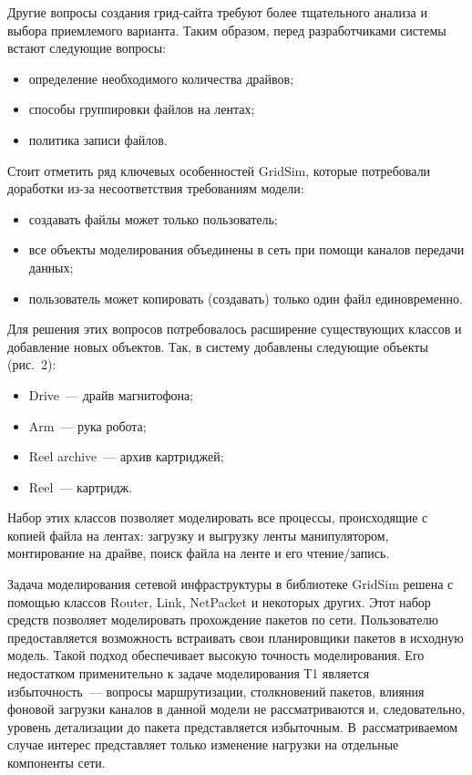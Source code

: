 \begin{multicols}{2}
   Другие вопросы создания грид-сай\-та требуют более тщательного анализа и 
выбора приемлемого варианта. Таким образом, перед разработчиками системы 
встают следующие вопросы:
   \begin{itemize}
   \item определение необходимого количества драйвов;
\item способы группировки файлов на лентах;
\item политика записи файлов.
\end{itemize}

   Стоит отметить ряд ключевых особенностей GridSim, которые потребовали 
доработки из-за несоответствия требованиям модели: 
   \begin{itemize}
   \item создавать файлы может только пользователь;
\item все объекты моделирования объединены в сеть при помощи 
каналов передачи данных;
\item пользователь может копировать (создавать) только один файл 
единовременно. 
\end{itemize}
   
   Для решения этих вопросов потребовалось расширение существующих 
классов и добавление новых объектов. Так, в сис\-те\-му добавлены следующие 
объекты (рис.~2):
   \begin{itemize}
\item Drive~--- драйв магнитофона;
\item Arm~--- рука робота;
\item Reel archive~--- архив картриджей;
\item Reel~--- картридж.
\end{itemize}




   Набор этих классов позволяет моделировать все процессы, происходящие с 
копией файла на лентах: загрузку и выгрузку ленты манипулятором, 
монтирование на драйве, поиск файла на ленте и его чте\-ние/за\-пись.
   
   Задача моделирования сетевой инфраструктуры в библиотеке GridSim 
решена с помощью классов Router, Link, NetPacket и некоторых других. Этот 
набор средств позволяет моделировать прохождение пакетов по сети. 
Пользователю предоставляется возможность встраивать свои планировщики 
пакетов в исходную модель. Такой подход обеспечивает высокую точность 
моделирования. Его недостатком применительно к задаче моделирования Т1 
является избыточность~--- вопросы маршрутизации, столкновений пакетов, 
влияния фоновой загрузки каналов в данной модели не рассматриваются и, 
следовательно, уровень детализации до пакета представляется избыточным. 
В~рас\-смат\-ри\-ва\-емом случае интерес представляет только изменение 
нагрузки на отдельные компоненты сети. 


\pagebreak

\end{multicols}

